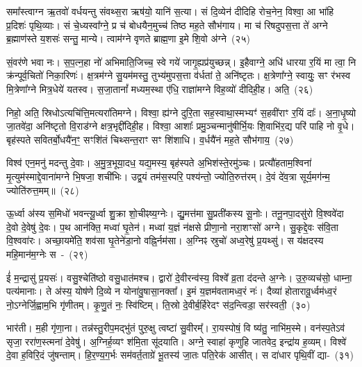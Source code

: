 {\anuvakamend[{पत्नी॑रि॒माꣳ रु॒द्रास्त्वाऽऽ च्छृ॑न्द॒न्त्वेका॒न्नविꣳ॑श॒तिश्च॑}]}

समा᳚स्त्वाग्न ऋ॒तवो॑ वर्धयन्तु संवथ्स॒रा ऋष॑यो॒ यानि॑ स॒त्या। सं दि॒व्येन॑ दीदिहि रोच॒नेन॒ विश्वा॒ आ भा॑हि प्र॒दिशः॑ पृथि॒व्याः। सं चे॒ध्यस्वा᳚ग्ने॒ प्र च॑ बोधयैन॒मुच्च॑ तिष्ठ मह॒ते सौभ॑गाय। मा च॑ रिषदुपस॒त्ता ते॑ अग्ने ब्र॒ह्माण॑स्ते य॒शसः॑ सन्तु॒ मान्ये। त्वाम॑ग्ने वृणते ब्राह्म॒णा इ॒मे शि॒वो अ॑ग्ने~(२५)\ip

सं॒वर॑णे भवा नः। स॒प॒त्न॒हा नो॑ अभिमाति॒जिच्च॒ स्वे गये॑ जागृ॒ह्यप्र॑युच्छन्न्। इ॒हैवाग्ने॒ अधि॑ धारया र॒यिं मा त्वा॒ नि क्र॑न्पूर्व॒चितो॑ निका॒रिणः॑। क्ष॒त्रम॑ग्ने सु॒यम॑मस्तु॒ तुभ्य॑मुपस॒त्ता व॑र्धतां ते॒ अनि॑ष्टृतः। क्ष॒त्रेणा᳚ग्ने॒ स्वायुः॒ सꣳ र॑भस्व मि॒त्रेणा᳚ग्ने मित्र॒धेये॑ यतस्व। स॒जा॒तानां᳚ मध्यम॒स्था ए॑धि॒ राज्ञा॑मग्ने विह॒व्यो॑ दीदिही॒ह। अति॒~(२६)\ip

निहो॒ अति॒ स्रिधो\-ऽत्यचि॑त्ति॒मत्यरा॑तिमग्ने। विश्वा॒ ह्य॑ग्ने दुरि॒ता सह॒स्वाथा॒स्मभ्यꣳ॑ स॒हवी॑राꣳ र॒यिं दाः᳚। अ॒ना॒धृ॒ष्यो जा॒तवे॑दा॒ अनि॑ष्टृतो वि॒राड॑ग्ने क्षत्र॒भृद्दी॑दिही॒ह। विश्वा॒ आशाः᳚ प्रमु॒ञ्चन्मानु॑षीर्भि॒यः शि॒वाभि॑र॒द्य परि॑ पाहि नो वृ॒धे। बृह॑स्पते सवितर्बो॒धयै॑न॒ꣳ॒ सꣳशि॑तं चिथ्सन्त॒राꣳ सꣳ शि॑शाधि। व॒र्धयै॑नं मह॒ते सौभ॑गाय॒~(२७)\ip

विश्व॑ एन॒मनु॑ मदन्तु दे॒वाः। अ॒मु॒त्र॒भूया॒दध॒ यद्य॒मस्य॒ बृह॑स्पते अ॒भिश॑स्ते॒रमु॑ञ्चः। प्रत्यौ॑हताम॒श्विना॑ मृ॒त्युम॑स्माद्दे॒वाना॑मग्ने भि॒षजा॒ शची॑भिः। उद्व॒यं तम॑स॒स्परि॒ पश्य॑न्तो॒ ज्योति॒रुत्त॑रम्। दे॒वं दे॑व॒त्रा सूर्य॒मग॑न्म॒ ज्योति॑रुत्त॒मम्॥~(२८)\ip

{\anuvakamend[{इ॒मे शि॒वो अ॒ग्ने\-ऽति॒ सौभ॑गाय॒ चतु॑स्त्रिꣳशच्च}]}

ऊ॒र्ध्वा अ॑स्य स॒मिधो॑ भवन्त्यू॒र्ध्वा शु॒क्रा शो॒चीꣴष्य॒ग्नेः। द्यु॒मत्त॑मा सु॒प्रती॑कस्य सू॒नोः। तनू॒नपा॒दसु॑रो वि॒श्ववे॑दा दे॒वो दे॒वेषु॑ दे॒वः। प॒थ आन॑क्ति॒ मध्वा॑ घृ॒तेन॑। मध्वा॑ य॒ज्ञं न॑क्षसे प्रीणा॒नो नरा॒शꣳसो॑ अग्ने। सु॒कृद्दे॒वः स॑वि॒ता वि॒श्ववा॑रः। अच्छा॒यमे॑ति॒ शव॑सा घृ॒तेने॑डा॒नो वह्नि॒र्नम॑सा। अ॒ग्निꣴ स्रुचो॑ अध्व॒रेषु॑ प्र॒यथ्सु॑। स य॑क्षदस्य महि॒मान॑म॒ग्नेः स~-~(२९)\ip

ई॑ म॒न्द्रासु॑ प्र॒यसः॑। वसु॒श्चेति॑ष्ठो वसु॒धात॑मश्च। द्वारो॑ दे॒वीरन्व॑स्य॒ विश्वे᳚ व्र॒ता द॑दन्ते अ॒ग्नेः। उ॒रु॒व्यच॑सो॒ धाम्ना॒ पत्य॑मानाः। ते अ॑स्य॒ योष॑णे दि॒व्ये न योना॑वु॒षासा॒नक्ता᳚। इ॒मं य॒ज्ञम॑वतामध्व॒रं नः॑। दैव्या॑ होतारावू॒र्ध्वम॑ध्व॒रं नो॒\-ऽग्नेर्जि॒ह्वाम॒भि गृ॑णीतम्। कृ॒णु॒तं नः॒ स्वि॑ष्टिम्। ति॒स्रो दे॒वीर्ब॒र्हिरेदꣳ स॑द॒न्त्विडा॒ सर॑स्वती॒~(३०)\ip

भार॑ती। म॒ही गृ॑णा॒ना। तन्न॑स्तु॒रीप॒मद्भु॑तं पुरु॒क्षु त्वष्टा॑ सु॒वीरम्᳚। रा॒यस्पोषं॒ वि ष्य॑तु॒ नाभि॑म॒स्मे। वन॑स्प॒ते\-ऽव॑ सृजा॒ ररा॑ण॒स्त्मना॑ दे॒वेषु॑। अ॒ग्निर्\mbox{}ह॒व्यꣳ श॑मि॒ता सू॑दयाति। अग्ने॒ स्वाहा॑ कृणुहि जातवेद॒ इन्द्रा॑य ह॒व्यम्। विश्वे॑ दे॒वा ह॒विरि॒दं जु॑षन्ताम्। हि॒र॒ण्य॒ग॒र्भः सम॑वर्त॒ताग्रे॑ भू॒तस्य॑ जा॒तः पति॒रेक॑ आसीत्। स दा॑धार पृथि॒वीं द्या-~(३१)\ip

